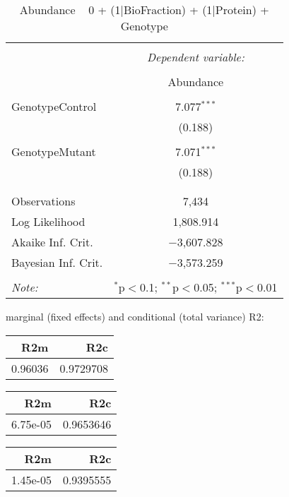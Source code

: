 \documentclass[11pt]{report}
\begin{document}
\begin{table}[!htbp] \centering 
  \caption{Abundance ~ 0 + (1|BioFraction) + (1|Protein) + Genotype} 
  \label{} 
\begin{tabular}{@{\extracolsep{5pt}}lc} 
\\[-1.8ex]\hline 
\hline \\[-1.8ex] 
 & \multicolumn{1}{c}{\textit{Dependent variable:}} \\ 
\cline{2-2} 
\\[-1.8ex] & Abundance \\ 
\hline \\[-1.8ex] 
 GenotypeControl & 7.077$^{***}$ \\ 
  & (0.188) \\ 
  & \\ 
 GenotypeMutant & 7.071$^{***}$ \\ 
  & (0.188) \\ 
  & \\ 
\hline \\[-1.8ex] 
Observations & 7,434 \\ 
Log Likelihood & 1,808.914 \\ 
Akaike Inf. Crit. & $-$3,607.828 \\ 
Bayesian Inf. Crit. & $-$3,573.259 \\ 
\hline 
\hline \\[-1.8ex] 
\textit{Note:}  & \multicolumn{1}{r}{$^{*}$p$<$0.1; $^{**}$p$<$0.05; $^{***}$p$<$0.01} \\ 
\end{tabular} 
\end{table} 
marginal (fixed effects) and conditional (total variance) R2:

\begin{tabular}{r|r}
\hline
R2m & R2c\\
\hline
0.96036 & 0.9729708\\
\hline
\end{tabular}

\begin{tabular}{r|r}
\hline
R2m & R2c\\
\hline
6.75e-05 & 0.9653646\\
\hline
\end{tabular}

\begin{tabular}{r|r}
\hline
R2m & R2c\\
\hline
1.45e-05 & 0.9395555\\
\hline
\end{tabular}
\end{document}
